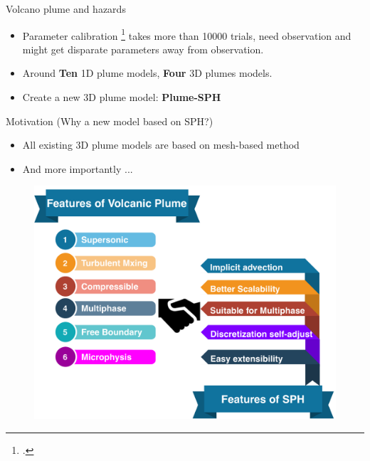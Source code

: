 \documentclass{beamer}
\begin{document}
\begin{frame}{Volcano plume and hazards}
\begin{figure}[!t]
\begin{minipage}{.325\textwidth}
\end{minipage}
\end{figure}
\begin{itemize}
\item Parameter calibration \footcite{fero2009simulating} takes more than 10000 trials, need observation and might get disparate parameters away from observation.
\item Around \textbf{Ten} 1D plume models, \textbf{Four} 3D plumes models.
\item Create a new 3D plume model: \textbf{Plume-SPH}
\end{itemize}

\end{frame}

\begin{frame}{Motivation (Why a new model based on SPH?)}
\begin{itemize}
\item All existing 3D plume models are based on mesh-based method
\item And more importantly ...
\end{itemize}

\begin{figure}
\centering
\includegraphics[width=.72\textwidth]{./PPT/Why_SPH}
\end{figure}
\end{frame}
\end{document}
